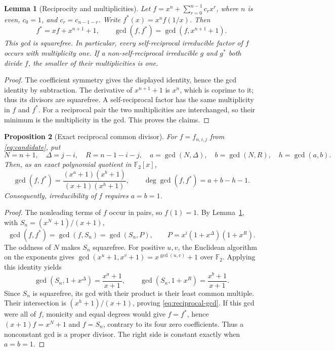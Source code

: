 \documentclass[11pt]{article}
\newtheorem{proposition}{Proposition}[section]
\newtheorem{lemma}[proposition]{Lemma}
\theoremstyle{definition}
\theoremstyle{remark}
\begin{document}
\begin{lemma}[Reciprocity and multiplicities]
\label{lem:reciprocal-multiplicity}
Let \(f=x^n+\sum_{r=0}^{n-1}c_rx^r\), where \(n\) is even,
\(c_0=1\), and \(c_r=c_{n-1-r}\). Write
\(f^*(x)=x^nf(1/x)\). Then
\[
 f^*=xf+x^{n+1}+1,\qquad
 \gcd(f,f^*)=\gcd(f,x^{n+1}+1).
\]
This gcd is squarefree. In particular, every self-reciprocal
irreducible factor of \(f\) occurs with multiplicity one. If a
non-self-reciprocal irreducible \(g\) and \(g^*\) both divide \(f\),
the smaller of their multiplicities is one.
\end{lemma}
\begin{proof}
The coefficient symmetry gives the displayed identity, hence the gcd
identity by subtraction. The derivative of \(x^{n+1}+1\) is \(x^n\),
which is coprime to it; thus its divisors are squarefree. A
self-reciprocal factor has the same multiplicity in \(f\) and \(f^*\).
For a reciprocal pair the two multiplicities are interchanged, so
their minimum is the multiplicity in the gcd. This proves the claims.
\end{proof}

\begin{proposition}[Exact reciprocal common divisor]
\label{prop:reciprocal-gcd}
For \(f=f_{n,i,j}\) from \eqref{eq:candidate}, put
\[
 N=n+1,\quad \Delta=j-i,\quad R=n-1-i-j,\quad
 a=\gcd(N,\Delta),\quad b=\gcd(N,R),\quad h=\gcd(a,b).
\]
Then, as an exact polynomial quotient in \(\mathbb F_2[x]\),
\begin{equation}\label{eq:reciprocal-gcd}
 \gcd(f,f^*)=
 \frac{(x^a+1)(x^b+1)}{(x+1)(x^h+1)},\qquad
 \deg\gcd(f,f^*)=a+b-h-1.
\end{equation}
Consequently, irreducibility of \(f\) requires \(a=b=1\).
\end{proposition}
\begin{proof}
The nonleading terms of \(f\) occur in pairs, so \(f(1)=1\).
By Lemma~\ref{lem:reciprocal-multiplicity}, with
\(S_n=(x^N+1)/(x+1)\),
\[
 \gcd(f,f^*)=\gcd(f,S_n)=\gcd(S_n,P),\qquad
 P=x^i(1+x^\Delta)(1+x^R).
\]
The oddness of \(N\) makes \(S_n\) squarefree. For positive $u,v$,
the Euclidean algorithm on the exponents gives
$\gcd(x^u+1,x^v+1)=x^{\gcd(u,v)}+1$ over $\mathbb F_2$.
Applying this identity yields
\[
 \gcd(S_n,1+x^\Delta)=\frac{x^a+1}{x+1},\qquad
 \gcd(S_n,1+x^R)=\frac{x^b+1}{x+1}.
\]
Since \(S_n\) is squarefree, its gcd with their product is their
least common multiple. Their intersection is
\((x^h+1)/(x+1)\), proving \eqref{eq:reciprocal-gcd}.
If this gcd were all of \(f\), monicity and equal degrees would give
\(f=f^*\), hence \((x+1)f=x^N+1\) and \(f=S_n\), contrary to its
four zero coefficients. Thus a nonconstant gcd is a proper divisor.
The right side is constant exactly when \(a=b=1\).
\end{proof}
\end{document}
